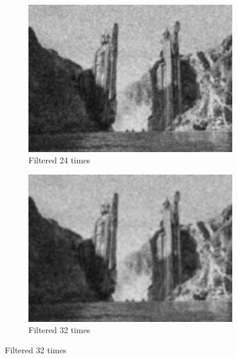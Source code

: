 \documentclass[paper=a4, fontsize=11pt]{scrartcl} %
\numberwithin{equation}{section} %
\numberwithin{figure}{section} %
\numberwithin{table}{section} %
\begin{document}
\begin{figure}[H]
\begin{subfigure}[b]{0.45\textwidth}
		\includegraphics[width=\textwidth]{gf_24.jpg}
		\caption{Filtered 24 times}
	\end{subfigure}
	\hspace{5mm}
	\begin{subfigure}[b]{0.45\textwidth}
		\includegraphics[width=\textwidth]{gf_32.jpg}
		\caption{Filtered 32 times}
	\end{subfigure}
\end{figure}
\end{document}

